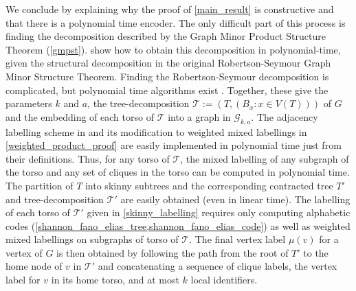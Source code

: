 \documentclass{patmorin}
\newcommand{\vida}[1]{\noindent{\color{pink} VD: #1}}
\begin{document}
We conclude by explaining why the proof of \cref{main_result} is constructive and that there is a polynomial time encoder.  The only difficult part of this process is finding the decomposition described by the Graph Minor Product Structure Theorem (\cref{gmpst}).  \citet{dujmovic.joret.ea:planar} show how to obtain this decomposition in polynomial-time, given the structural decomposition in the original Robertson-Seymour Graph Minor Structure Theorem. Finding the Robertson-Seymour decomposition is complicated, but polynomial time algorithms exist \cite{kawarabayashi2018flat,kawarabayashi2020new,gorsky2025polynomial,demaine2005algorithmic}.  Together, these give the parameters $k$ and $a$, the tree-decomposition $\mathcal{T}:=(T, (B_x:x\in V(T)))$ of $G$ and the embedding of each torso of $\mathcal{T}$ into a graph in $\mathcal{G}_{k,a}$. The adjacency labelling scheme in \cite{dujmovic.esperet.ea:adjacency} and its modification to weighted mixed labellings in \cref{weighted_product_proof} are easily implemented in polynomial time just from their definitions.  Thus, for any torso of $\mathcal{T}$, the mixed labelling of any subgraph of the torso and any set of cliques in the torso can be computed in polynomial time.  The partition of $T$ into skinny subtrees and the corresponding contracted tree $T'$ and tree-decomposition $\mathcal{T}'$ are easily obtained (even in linear time).  The labelling of each torso of $\mathcal{T}'$ given in \cref{skinny_labelling} requires only computing  alphabetic codes (\cref{shannon_fano_elias_tree,shannon_fano_elias_code}) as well as weighted mixed labellings on subgraphs of torso of $\mathcal{T}$.  The final vertex label $\mu(v)$ for a vertex of $G$ is then obtained by following the path from the root of $T'$ to the home node of $v$ in $\mathcal{T}'$ and concatenating a sequence of clique labels, the vertex label for $v$ in its home torso, and at most $k$ local identifiers.



\end{document}
